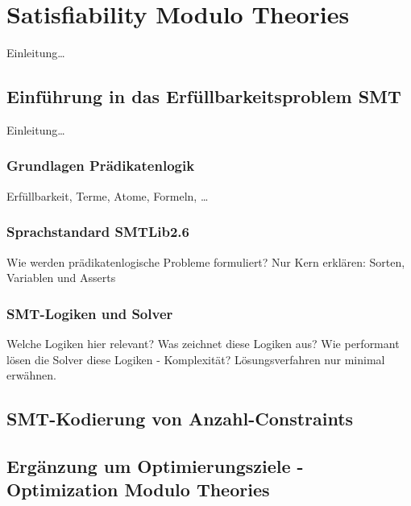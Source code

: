 \section{Satisfiability Modulo Theories}
Einleitung\ldots

\subsection{Einführung in das Erfüllbarkeitsproblem SMT}
Einleitung\ldots

\subsubsection{Grundlagen Prädikatenlogik}
Erfüllbarkeit, Terme, Atome, Formeln, \ldots

\subsubsection{Sprachstandard SMTLib2.6}
Wie werden prädikatenlogische Probleme formuliert?
Nur Kern erklären: Sorten, Variablen und Asserts

\subsubsection{SMT-Logiken und Solver}
Welche Logiken hier relevant?
Was zeichnet diese Logiken aus?
Wie performant lösen die Solver diese Logiken - Komplexität? Lösungsverfahren nur minimal erwähnen.

\subsection{SMT-Kodierung von Anzahl-Constraints}

\subsection{Ergänzung um Optimierungsziele - Optimization Modulo Theories}
